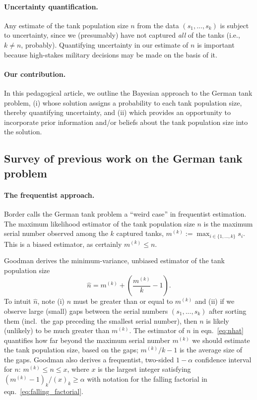 \documentclass[11pt, oneside]{article}
\newcommand{\data}{$(s_1, ..., s_k)$\xspace}
\begin{document}
\paragraph{Uncertainty quantification.}
Any estimate of the tank population size $n$ from the data \data is subject to uncertainty, since we (presumably) have not captured \emph{all} of the tanks (i.e., $k\neq n$, probably).  
Quantifying uncertainty in our estimate of $n$ is important because high-stakes military decisions may be made on the basis of it.

\paragraph{Our contribution.}
In this pedagogical article, we outline the Bayesian approach to the German tank problem, 
(i) whose solution assigns a probability to each tank population size, thereby quantifying uncertainty, and
(ii) which provides an opportunity to incorporate prior information and/or beliefs about the tank population size into the solution.


\subsection{Survey of previous work on the German tank problem}
\paragraph{The frequentist approach.}
Border \cite{bordernotes} calls the German tank problem a ``weird case'' in frequentist estimation. The maximum likelihood estimator of the tank population size $n$ is the maximum serial number observed among the $k$ captured tanks, $m^{(k)}:=\max_{i \in \{1, ..., k\}} s_i$. This is a biased estimator, as certainly $m^{(k)} \leq n$.

Goodman \cite{goodman1952serial,goodman1954some} derives the minimum-variance, unbiased estimator of the tank population size
\begin{equation}
	\hat{n} = m^{(k)} + \left(\frac{m^{(k)}}{k}-1 \right). \label{eq:nhat}
\end{equation}
To intuit $\hat{n}$, note (i) $n$ must be greater than or equal to $m^{(k)}$ and (ii) if we observe large (small) gaps between the serial numbers \data after sorting them (incl.\ the gap preceding the smallest serial number), then $n$ is likely (unlikely) to be much greater than $m^{(k)}$. 
The estimator of $n$ in eqn.~\ref{eq:nhat} quantifies how far beyond the maximum serial number $m^{(k)}$ we should estimate the tank population size, based on the gaps; $m^{(k)}/k-1$ is the average size of the gaps.
Goodman \cite{goodman1952serial} also derives a frequentist, two-sided $1-\alpha$ confidence interval for $n$: $m^{(k)}\leq n \leq x$, where $x$ is the largest integer satisfying $(m^{(k)}-1)_{k} /(x)_k \geq \alpha$ with notation for the falling factorial in eqn.~\ref{eq:falling_factorial}.
\end{document}
